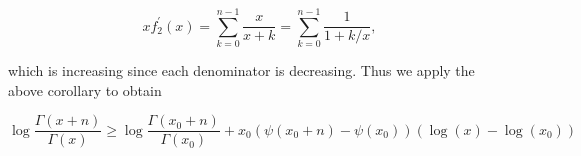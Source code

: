 \documentclass[nofootinbib,amssymb,amsmath]{revtex4}
\begin{document}
\begin{equation}
x f_2^\prime(x) = \sum_{k=0}^{n-1} \frac{x}{x+k} = \sum_{k=0}^{n-1} \frac{1}{1+k/x},
\end{equation}

which is increasing since each denominator is decreasing.  Thus we apply the above corollary to obtain

\begin{equation} \label{bound2}
\log \frac{ \Gamma(x + n) }{ \Gamma(x) } \ge \log \frac{ \Gamma(x_0 + n) }{ \Gamma(x_0) } + x_0 \left( \psi(x_0 + n) - \psi(x_0) \right)  \left( \log(x) - \log(x_0) \right)
\end{equation}
\end{document}
